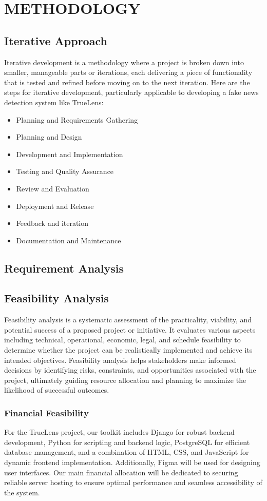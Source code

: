 \chapter{METHODOLOGY}
\section{Iterative Approach}
Iterative development is a methodology where a project is broken down into smaller, manageable parts or iterations, each delivering a piece of functionality that is tested and refined before moving on to the next iteration. Here are the steps for iterative development, particularly applicable to developing a fake news detection system like TrueLens:
\begin{itemize}
    \setlength\itemsep{0.25em}
    \item Planning and Requirements Gathering
    \item Planning and Design
    \item Development and Implementation
    \item Testing and Quality Assurance
    \item Review and Evaluation
    \item Deployment and Release
    \item Feedback and iteration
    \item Documentation and Maintenance
\end{itemize}
\section{Requirement Analysis}
\section{Feasibility Analysis}
Feasibility analysis is a systematic assessment of the practicality, viability, and potential success of a proposed project or initiative. It evaluates various aspects including technical, operational, economic, legal, and schedule feasibility to determine whether the project can be realistically implemented and achieve its intended objectives. Feasibility analysis helps stakeholders make informed decisions by identifying risks, constraints, and opportunities associated with the project, ultimately guiding resource allocation and planning to maximize the likelihood of successful outcomes.
\subsection{Financial Feasibility}
For the TrueLens project, our toolkit includes Django for robust backend development, Python for scripting and backend logic, PostgreSQL for efficient database management, and a combination of HTML, CSS, and JavaScript for dynamic frontend implementation. Additionally, Figma will be used for designing user interfaces. Our main financial allocation will be dedicated to securing reliable server hosting to ensure optimal performance and seamless accessibility of the system.

